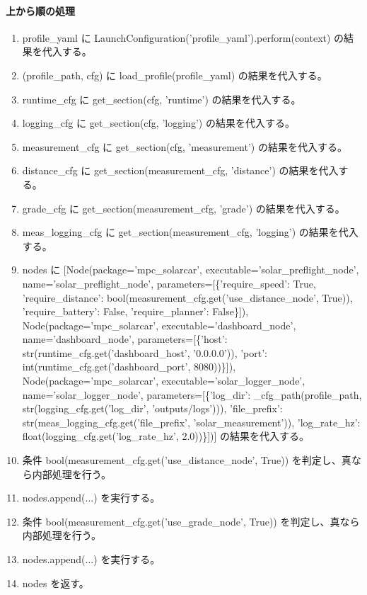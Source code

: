 \documentclass[a4paper,11pt]{article}
\begin{document}
            \paragraph{上から順の処理}
            \begin{enumerate}[leftmargin=1.8em]
            \item profile\_yaml に LaunchConfiguration('profile\_yaml').perform(context) の結果を代入する。
\item (profile\_path, cfg) に load\_profile(profile\_yaml) の結果を代入する。
\item runtime\_cfg に get\_section(cfg, 'runtime') の結果を代入する。
\item logging\_cfg に get\_section(cfg, 'logging') の結果を代入する。
\item measurement\_cfg に get\_section(cfg, 'measurement') の結果を代入する。
\item distance\_cfg に get\_section(measurement\_cfg, 'distance') の結果を代入する。
\item grade\_cfg に get\_section(measurement\_cfg, 'grade') の結果を代入する。
\item meas\_logging\_cfg に get\_section(measurement\_cfg, 'logging') の結果を代入する。
\item nodes に [Node(package='mpc\_solarcar', executable='solar\_preflight\_node', name='solar\_preflight\_node', parameters=[\{'require\_speed': True, 'require\_distance': bool(measurement\_cfg.get('use\_distance\_node', True)), 'require\_battery': False, 'require\_planner': False\}]), Node(package='mpc\_solarcar', executable='dashboard\_node', name='dashboard\_node', parameters=[\{'host': str(runtime\_cfg.get('dashboard\_host', '0.0.0.0')), 'port': int(runtime\_cfg.get('dashboard\_port', 8080))\}]), Node(package='mpc\_solarcar', executable='solar\_logger\_node', name='solar\_logger\_node', parameters=[\{'log\_dir': \_cfg\_path(profile\_path, str(logging\_cfg.get('log\_dir', 'outputs/logs'))), 'file\_prefix': str(meas\_logging\_cfg.get('file\_prefix', 'solar\_measurement')), 'log\_rate\_hz': float(logging\_cfg.get('log\_rate\_hz', 2.0))\}])] の結果を代入する。
\item 条件 bool(measurement\_cfg.get('use\_distance\_node', True)) を判定し、真なら内部処理を行う。
\item   nodes.append(...) を実行する。
\item 条件 bool(measurement\_cfg.get('use\_grade\_node', True)) を判定し、真なら内部処理を行う。
\item   nodes.append(...) を実行する。
\item nodes を返す。
            \end{enumerate}
\end{document}
